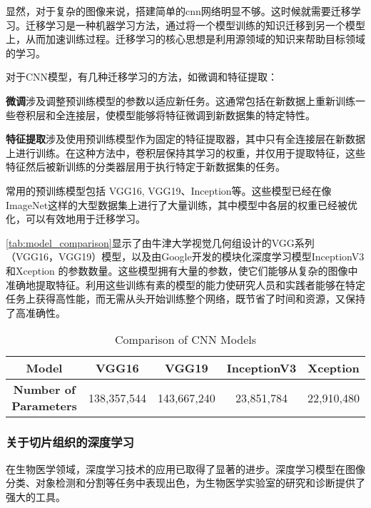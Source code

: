显然，对于复杂的图像来说，搭建简单的cnn网络明显不够。这时候就需要迁移学习。迁移学习是一种机器学习方法，通过将一个模型训练的知识迁移到另一个模型上，从而加速训练过程。迁移学习的核心思想是利用源领域的知识来帮助目标领域的学习。\cite{4.30 4}

对于CNN模型，有几种迁移学习的方法，如微调和特征提取：

\textbf{微调}涉及调整预训练模型的参数以适应新任务。这通常包括在新数据上重新训练一些卷积层和全连接层，使模型能够将特征微调到新数据集的特定特性。\cite{4.30 5}

\textbf{特征提取}涉及使用预训练模型作为固定的特征提取器，其中只有全连接层在新数据上进行训练。在这种方法中，卷积层保持其学习的权重，并仅用于提取特征，这些特征然后被新训练的分类器层用于执行特定于新数据集的任务。\cite{4.30 6}

常用的预训练模型包括 VGG16, VGG19、Inception等。这些模型已经在像ImageNet这样的大型数据集上进行了大量训练，其中模型中各层的权重已经被优化，可以有效地用于迁移学习。\cite{4.30 7}

\autoref{tab:model_comparison}显示了由牛津大学视觉几何组设计的VGG系列（VGG16，VGG19）模型\cite{DL.5}，以及由Google开发的模块化深度学习模型InceptionV3 \cite{DL.6}和Xception \cite{DL.7}的参数数量。这些模型拥有大量的参数，使它们能够从复杂的图像中准确地提取特征。利用这些训练有素的模型的能力使研究人员和实践者能够在特定任务上获得高性能，而无需从头开始训练整个网络，既节省了时间和资源，又保持了高准确性。\cite{4.30 8}

\begin{table}[htbp]
    \centering
    \caption{Comparison of CNN Models}
    \label{tab:model_comparison}
    \begin{tabular}{ccccc}
        \toprule
        \textbf{Model} & \textbf{VGG16} & \textbf{VGG19} & \textbf{InceptionV3} & \textbf{Xception} \\
        \midrule
        \textbf{Number of Parameters} & 138,357,544 & 143,667,240 & 23,851,784 & 22,910,480 \\
        \bottomrule
    \end{tabular}
\end{table}

\subsubsection{关于切片组织的深度学习}

在生物医学领域，深度学习技术的应用已取得了显著的进步。深度学习模型在图像分类、对象检测和分割等任务中表现出色，为生物医学实验室的研究和诊断提供了强大的工具。

